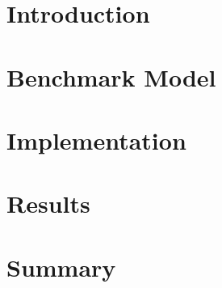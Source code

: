\documentclass{llncs}
\begin{document}

\section{Introduction}
\label{sec:intro}



\section{Benchmark Model}
\label{sec:benchmark_model}


\section{Implementation}
\label{sec:implementation}


\section{Results}
\label{sec:results}


\section{Summary}
\label{sec:summary}


\printbibliography
\end{document}
